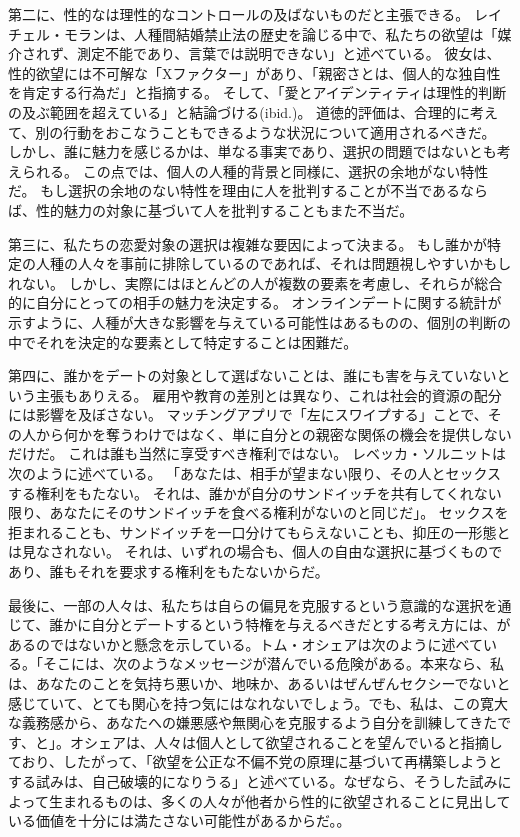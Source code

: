\documentclass[paper=a4,book,openany]{jlreq} \usepackage{mystyle}
\begin{document}
第二に、性的なは理性的なコントロールの及ばないものだと主張できる。
レイチェル・モランは、人種間結婚禁止法の歴史を論じる中で、私たちの欲望は「媒介されず、測定不能であり、言葉では説明できない」と述べている\citep[p. 14]{moran01:_inter_intim}。
彼女は、性的欲望には不可解な「Xファクター」があり、「親密さとは、個人的な独自性を肯定する行為だ」と指摘する。
そして、「愛とアイデンティティは理性的判断の及ぶ範囲を超えている」と結論づける(ibid.)。
道徳的評価は、合理的に考えて、別の行動をおこなうこともできるような状況について適用されるべきだ。
しかし、誰に魅力を感じるかは、単なる事実であり、選択の問題ではないとも考えられる。
この点では、個人の人種的背景と同様に、選択の余地がない特性だ。
もし選択の余地のない特性を理由に人を批判することが不当であるならば、性的魅力の対象に基づいて人を批判することもまた不当だ。

第三に、私たちの恋愛対象の選択は複雑な要因によって決まる。
もし誰かが特定の人種の人々を事前に排除しているのであれば、それは問題視しやすいかもしれない。
しかし、実際にはほとんどの人が複数の要素を考慮し、それらが総合的に自分にとっての相手の魅力を決定する。
オンラインデートに関する統計が示すように、人種が大きな影響を与えている可能性はあるものの、個別の判断の中でそれを決定的な要素として特定することは困難だ。

第四に、誰かをデートの対象として選ばないことは、誰にも害を与えていないという主張もありえる。
雇用や教育の差別とは異なり、これは社会的資源の配分には影響を及ぼさない。
マッチングアプリで「左にスワイプする」ことで、その人から何かを奪うわけではなく、単に自分との親密な関係の機会を提供しないだけだ。
これは誰も当然に享受すべき権利ではない。
レベッカ・ソルニットは次のように述べている。
「あなたは、相手が望まない限り、その人とセックスする権利をもたない。
それは、誰かが自分のサンドイッチを共有してくれない限り、あなたにそのサンドイッチを食べる権利がないのと同じだ」\citep{solnit15:_men_explain_lolit_me}。
セックスを拒まれることも、サンドイッチを一口分けてもらえないことも、抑圧の一形態とは見なされない。
それは、いずれの場合も、個人の自由な選択に基づくものであり、誰もそれを要求する権利をもたないからだ。

最後に、一部の人々は、私たちは自らの偏見を克服するという意識的な選択を通じて、誰かに自分とデートするという特権を与えるべきだとする考え方には、があるのではないかと懸念を示している。トム・オシェアは次のように述べている。「そこには、次のようなメッセージが潜んでいる危険がある。本来なら、私は、あなたのことを気持ち悪いか、地味か、あるいはぜんぜんセクシーでないと感じていて、とても関心を持つ気にはなれないでしょう。でも、私は、この寛大な義務感から、あなたへの嫌悪感や無関心を克服するよう自分を訓練してきたです、と」。オシェアは、人々は個人として欲望されることを望んでいると指摘しており、したがって、「欲望を公正な不偏不党の原理に基づいて再構築しようとする試みは、自己破壊的になりうる」と述べている。なぜなら、そうした試みによって生まれるものは、多くの人々が他者から性的に欲望されることに見出している価値を十分には満たさない可能性があるからだ\citep{oshea20:_sexual_desir_struc_injus}。。
\end{document}
